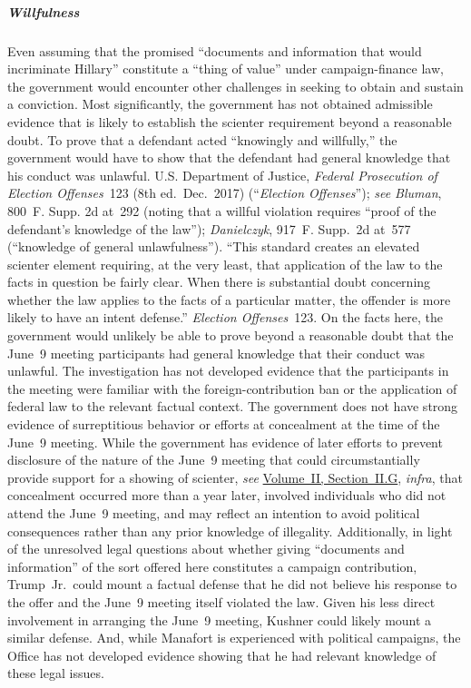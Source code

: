 \subparagraph{Willfulness}
Even assuming that the promised ``documents and information that would incriminate Hillary'' constitute a ``thing of value'' under campaign-finance law, the government would encounter other challenges in seeking to obtain and sustain a conviction.
Most significantly, the government has not obtained admissible evidence that is likely to establish the scienter requirement beyond a reasonable doubt.
To prove that a defendant acted ``knowingly and willfully,'' the government would have to show that the defendant had general knowledge that his conduct was unlawful.
U.S. Department of Justice, \textit{Federal Prosecution of Election Offenses}~123 (8th ed.\ Dec.~2017) (``\textit{Election Offenses}''); \textit{see Bluman}, 800~F. Supp. 2d at~292 (noting that a willful violation requires ``proof of the defendant's knowledge of the law''); \textit{Danielczyk}, 917~F. Supp.~2d at~577 (``knowledge of general unlawfulness'').
``This standard creates an elevated scienter element requiring, at the very least, that application of the law to the facts in question be fairly clear.
When there is substantial doubt concerning whether the law applies to the facts of a particular matter, the offender is more likely to have an intent defense.''
\textit{Election Offenses}~123.
On the facts here, the government would unlikely be able to prove beyond a reasonable doubt that the June~9 meeting participants had general knowledge that their conduct was unlawful.
The investigation has not developed evidence that the participants in the meeting were familiar with the foreign-contribution ban or the application of federal law to the relevant factual context.
The government does not have strong evidence of surreptitious behavior or efforts at concealment at the time of the June~9 meeting.
While the government has evidence of later efforts to prevent disclosure of the nature of the June~9 meeting that could circumstantially provide support for a showing of scienter, \textit{see} \hyperlink{subsection.2.2.7}{Volume~II, Section~II.G}, \textit{infra}, that concealment occurred more than a year later, involved individuals who did not attend the June~9 meeting, and may reflect an intention to avoid political consequences rather than any prior knowledge of illegality.
Additionally, in light of the unresolved legal questions about whether giving ``documents and information'' of the sort offered here constitutes a campaign contribution, Trump~Jr.\ could mount a factual defense that he did not believe his response to the offer and the June~9 meeting itself violated the law.
Given his less direct involvement in arranging the June~9 meeting, Kushner could likely mount a similar defense.
And, while Manafort is experienced with political campaigns, the Office has not developed evidence showing that he had relevant knowledge of these legal issues.

